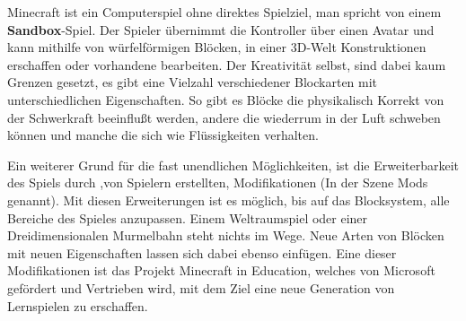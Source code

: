 Minecraft ist ein Computerspiel ohne direktes Spielziel, man spricht von einem \textbf{Sandbox}-Spiel.
Der Spieler übernimmt die Kontroller über einen Avatar und kann mithilfe von würfelförmigen Blöcken,
in einer 3D-Welt Konstruktionen erschaffen oder vorhandene bearbeiten. Der Kreativität selbst,
sind dabei kaum Grenzen gesetzt, es gibt eine Vielzahl verschiedener Blockarten mit unterschiedlichen
Eigenschaften. So gibt es Blöcke die physikalisch Korrekt von der Schwerkraft beeinflußt werden,
andere die wiederrum in der Luft schweben können und manche die sich wie Flüssigkeiten verhalten.
\cite{WikiMinecraft}

Ein weiterer Grund für die fast unendlichen Möglichkeiten, ist die Erweiterbarkeit des Spiels durch
,von Spielern erstellten, Modifikationen (In der Szene Mods genannt). Mit diesen Erweiterungen ist es
möglich, bis auf das Blocksystem, alle Bereiche des Spieles anzupassen. Einem Weltraumspiel oder einer
Dreidimensionalen Murmelbahn steht nichts im Wege. Neue Arten von Blöcken mit neuen Eigenschaften lassen
sich dabei ebenso einfügen. Eine dieser Modifikationen ist das Projekt Minecraft in Education, welches
von Microsoft gefördert und Vertrieben wird, mit dem Ziel eine neue Generation von Lernspielen zu erschaffen.
